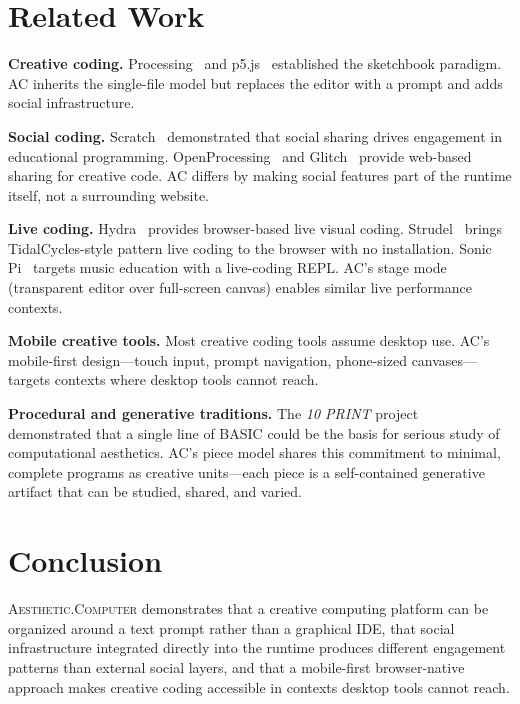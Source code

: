 \documentclass[10pt,letterpaper,twocolumn]{article}
\newcommand{\ac}{\textsc{Aesthetic.Computer}}
\begin{document}

\section{Related Work}

\textbf{Creative coding.} Processing~\citep{reas2007processing} and p5.js~\citep{mccarthy2015p5js} established the sketchbook paradigm. AC inherits the single-file model but replaces the editor with a prompt and adds social infrastructure.

\textbf{Social coding.} Scratch~\citep{resnick2009scratch} demonstrated that social sharing drives engagement in educational programming. OpenProcessing~\citep{openprocessing2009} and Glitch~\citep{glitch2017} provide web-based sharing for creative code. AC differs by making social features part of the runtime itself, not a surrounding website.

\textbf{Live coding.} Hydra~\citep{hydra2019} provides browser-based live visual coding. Strudel~\citep{roos2023strudel} brings TidalCycles-style pattern live coding to the browser with no installation. Sonic Pi~\citep{aaron2016sonic} targets music education with a live-coding REPL. AC's stage mode (transparent editor over full-screen canvas) enables similar live performance contexts.

\textbf{Mobile creative tools.} Most creative coding tools assume desktop use. AC's mobile-first design---touch input, prompt navigation, phone-sized canvases---targets contexts where desktop tools cannot reach.

\textbf{Procedural and generative traditions.} The \emph{10 PRINT} project~\citep{montfort201210print} demonstrated that a single line of BASIC could be the basis for serious study of computational aesthetics. AC's piece model shares this commitment to minimal, complete programs as creative units---each piece is a self-contained generative artifact that can be studied, shared, and varied.


\section{Conclusion}

\ac{} demonstrates that a creative computing platform can be organized around a text prompt rather than a graphical IDE, that social infrastructure integrated directly into the runtime produces different engagement patterns than external social layers, and that a mobile-first browser-native approach makes creative coding accessible in contexts desktop tools cannot reach.
\end{document}
